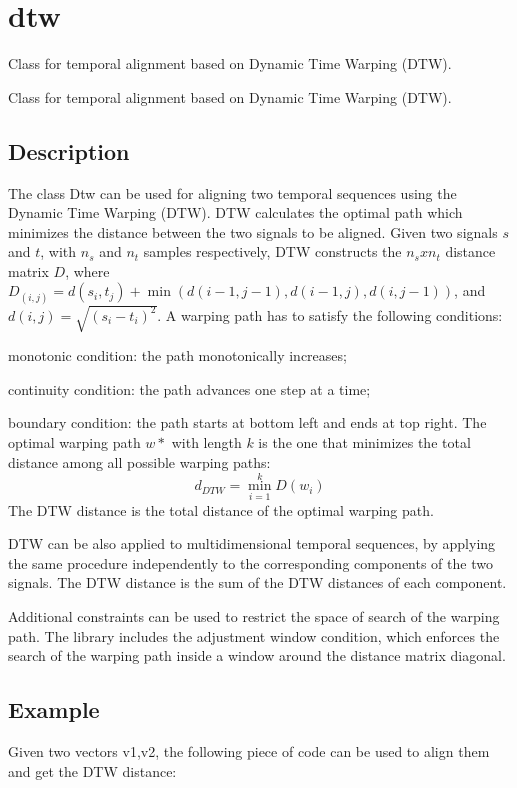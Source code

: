 \section{dtw}
\label{group__dtw}


Class for temporal alignment based on Dynamic Time Warping (D\+TW).  


Class for temporal alignment based on Dynamic Time Warping (D\+TW). 

\hypertarget{group__skeletonViewer_intro_sec}{}\subsection{Description}\label{group__skeletonViewer_intro_sec}
The class Dtw can be used for aligning two temporal sequences using the Dynamic Time Warping (D\+TW). D\+TW calculates the optimal path which minimizes the distance between the two signals to be aligned. Given two signals $s$ and $t$, with $n_s$ and $n_t$ samples respectively, D\+TW constructs the $n_s x n_t$ distance matrix $D$, where $D_{(i,j)} = d(s_i,t_j) + \min{(d(i-1,j-1),d(i-1,j),d(i,j-1))}$, and $d(i,j) = \sqrt{(s_i-t_i)^2}$. A warping path has to satisfy the following conditions\+:
\begin{DoxyItemize}
\item monotonic condition\+: the path monotonically increases;
\item continuity condition\+: the path advances one step at a time;
\item boundary condition\+: the path starts at bottom left and ends at top right. The optimal warping path $w*$ with length $k$ is the one that minimizes the total distance among all possible warping paths\+: \[d_{DTW} = \min_{i=1}^k D(w_i)\] The D\+TW distance is the total distance of the optimal warping path.
\end{DoxyItemize}

D\+TW can be also applied to multidimensional temporal sequences, by applying the same procedure independently to the corresponding components of the two signals. The D\+TW distance is the sum of the D\+TW distances of each component.

Additional constraints can be used to restrict the space of search of the warping path. The library includes the adjustment window condition, which enforces the search of the warping path inside a window around the distance matrix diagonal.\hypertarget{group__dtw_code_example_sec}{}\subsection{Example}\label{group__dtw_code_example_sec}
Given two vectors v1,v2, the following piece of code can be used to align them and get the D\+TW distance\+:


